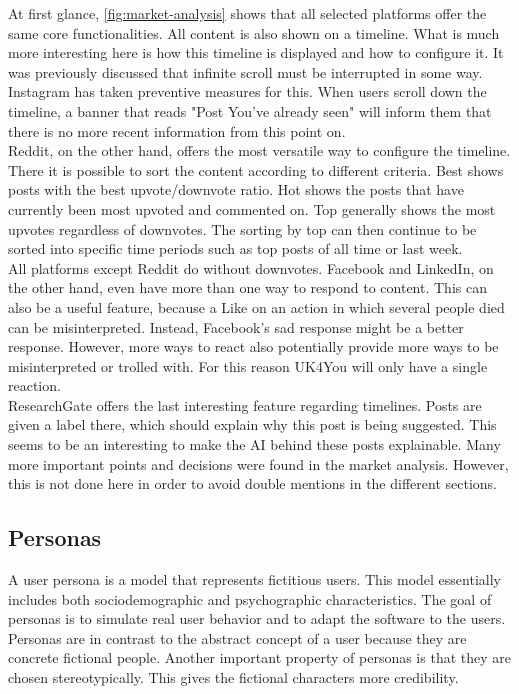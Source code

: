 At first glance, \autoref{fig:market-analysis} shows that all selected platforms offer the same core functionalities.
All content is also shown on a timeline.
What is much more interesting here is how this timeline is displayed and how to configure it.
It was previously discussed that infinite scroll must be interrupted in some way.
Instagram has taken preventive measures for this.
When users scroll down the timeline, a banner that reads "Post You've already seen" will inform them that there is no more recent information from this point on.\\

Reddit, on the other hand, offers the most versatile way to configure the timeline.
There it is possible to sort the content according to different criteria.
Best shows posts with the best upvote/downvote ratio. Hot shows the posts that have currently been most upvoted and commented on.
Top generally shows the most upvotes regardless of downvotes.
The sorting by top can then continue to be sorted into specific time periods such as top posts of all time or last week.\\

All platforms except Reddit do without downvotes. Facebook and LinkedIn, on the other hand, even have more than one way to respond to content.
This can also be a useful feature, because a Like on an action in which several people died can be misinterpreted.
Instead, Facebook's sad response might be a better response.
However, more ways to react also potentially provide more ways to be misinterpreted or trolled with.
For this reason UK4You will only have a single reaction.\\

ResearchGate offers the last interesting feature regarding timelines.
Posts are given a label there, which should explain why this post is being suggested.
This seems to be an interesting to make the AI behind these posts explainable.
Many more important points and decisions were found in the market analysis.
However, this is not done here in order to avoid double mentions in the different sections.\\

\subsection{Personas}
A user persona is a model that represents fictitious users\cite[p. 123]{cooper-alan}. 
This model essentially includes both sociodemographic and psychographic characteristics.
The goal of personas is to simulate real user behavior and to adapt the software to the users.
Personas are in contrast to the abstract concept of a user because they are concrete fictional people.
Another important property of personas is that they are chosen stereotypically.
This gives the fictional characters more credibility\cite[p.127]{cooper-alan}.\\

